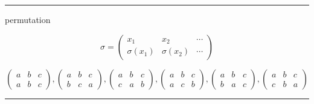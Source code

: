 \documentclass[
]{book}
\theoremstyle{definition}
\theoremstyle{definition}
\theoremstyle{definition}
\theoremstyle{definition}
\theoremstyle{remark}
\begin{document}
\begin{center}\rule{0.5\linewidth}{0.5pt}\end{center}

permutation

\[
\sigma=\begin{pmatrix}x_{{\scriptscriptstyle 1}} & x_{{\scriptscriptstyle 2}} & \cdots\\
\sigma\left(x_{{\scriptscriptstyle 1}}\right) & \sigma\left(x_{{\scriptscriptstyle 2}}\right) & \cdots
\end{pmatrix}
\]

\[
\begin{pmatrix}a & b & c\\
a & b & c
\end{pmatrix},\begin{pmatrix}a & b & c\\
b & c & a
\end{pmatrix},\begin{pmatrix}a & b & c\\
c & a & b
\end{pmatrix},\begin{pmatrix}a & b & c\\
a & c & b
\end{pmatrix},\begin{pmatrix}a & b & c\\
b & a & c
\end{pmatrix},\begin{pmatrix}a & b & c\\
c & b & a
\end{pmatrix}
\]

\begin{center}\rule{0.5\linewidth}{0.5pt}\end{center}
\end{document}
